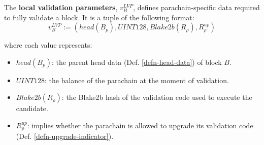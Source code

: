 \begin{definition}
  \label{defn-local-validation-parameters}
  The \textbf{local validation parameters}, $v^{LVP}_B$, defines parachain-specific
  data required to fully validate a block. It is a tuple of the following format:
  \[
    v^{LVP}_B := (head(B_p), UINT128, Blake2b(R_{\rho}), R^{up}_{\rho})
  \]

  where each value represents:
  \begin{itemize}
    \item $head(B_p)$: the parent head data (Def. \ref{defn-head-data}) of block
    $B$.
    \item $UINT128$: the balance of the parachain at the moment of validation.
    \item $Blake2b(R_{\rho})$: the Blake2b hash of the validation code used to
    execute the candidate.
    \item $R^{up}_{\rho}$: implies whether the parachain is allowed to upgrade
    its validation code (Def. \ref{defn-upgrade-indicator}).
  \end{itemize}
\end{definition}

